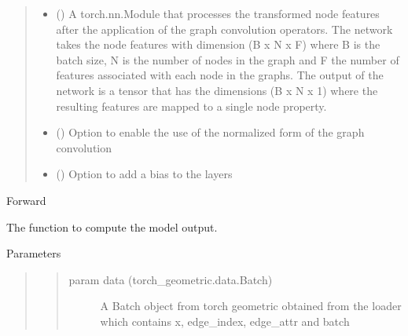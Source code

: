 \documentclass[letterpaper,10pt,english]{sphinxmanual}
\begin{document}
\begin{fulllineitems}
\begin{quote}
\begin{description}
\begin{itemize}
\item {} 
 () \textendash{} A torch.nn.Module that processes the transformed node features after the application
of the graph convolution operators. The network takes the node features with dimension
(B x N x F) where B is the batch size, N is the number of nodes in the graph and F
the number of features associated with each node in the graphs. The output of the network
is a tensor that has the dimensions (B x N x 1) where the resulting features are
mapped to a single node property.

\item {} 
 (\sphinxstyleliteralemphasis{\sphinxupquote{, }}) \textendash{} Option to enable the use of the normalized form of the graph convolution

\item {} 
 (\sphinxstyleliteralemphasis{\sphinxupquote{, }}) \textendash{} Option to add a bias to the layers

\end{itemize}

\end{description}\end{quote}

\begin{fulllineitems}
\label{\detokenize{modules/gqcml.torchgeom_interface:gqcml.torchgeom_interface.models_3.GatedGraphConv.forward}}
Forward

The function to compute the model output.

Parameters
\begin{quote}
\begin{quote}\begin{description}
\item[{param data (torch\_geometric.data.Batch)}] \leavevmode
A Batch object from torch geometric obtained from the loader
which contains x, edge\_index, edge\_attr and batch


\end{description}
\end{quote}
\end{quote}
\end{fulllineitems}
\end{fulllineitems}
\end{document}
